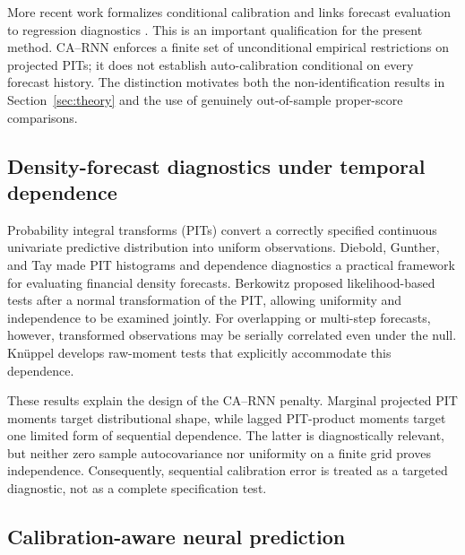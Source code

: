 \documentclass[11pt]{article}
\begin{document}
More recent work formalizes conditional calibration and links forecast
evaluation to regression diagnostics \cite{gneiting2023conditional}.  This is an
important qualification for the present method.  CA--RNN enforces a finite set of
unconditional empirical restrictions on projected PITs; it does not establish
auto-calibration conditional on every forecast history.  The distinction
motivates both the non-identification results in Section~\ref{sec:theory} and the
use of genuinely out-of-sample proper-score comparisons.

\subsection{Density-forecast diagnostics under temporal dependence}

Probability integral transforms (PITs) convert a correctly specified continuous
univariate predictive distribution into uniform observations.  Diebold,
Gunther, and Tay \cite{diebold1998density} made PIT histograms and dependence
diagnostics a practical framework for evaluating financial density forecasts.
Berkowitz \cite{berkowitz2001testing} proposed likelihood-based tests after a
normal transformation of the PIT, allowing uniformity and independence to be
examined jointly.  For overlapping or multi-step forecasts, however, transformed
observations may be serially correlated even under the null.  Kn\"uppel
\cite{knuppel2015multistep} develops raw-moment tests that explicitly accommodate
this dependence.

These results explain the design of the CA--RNN penalty.  Marginal projected PIT
moments target distributional shape, while lagged PIT-product moments target one
limited form of sequential dependence.  The latter is diagnostically relevant,
but neither zero sample autocovariance nor uniformity on a finite grid proves
independence.  Consequently, sequential calibration error is treated as a
targeted diagnostic, not as a complete specification test.

\subsection{Calibration-aware neural prediction}
\end{document}

